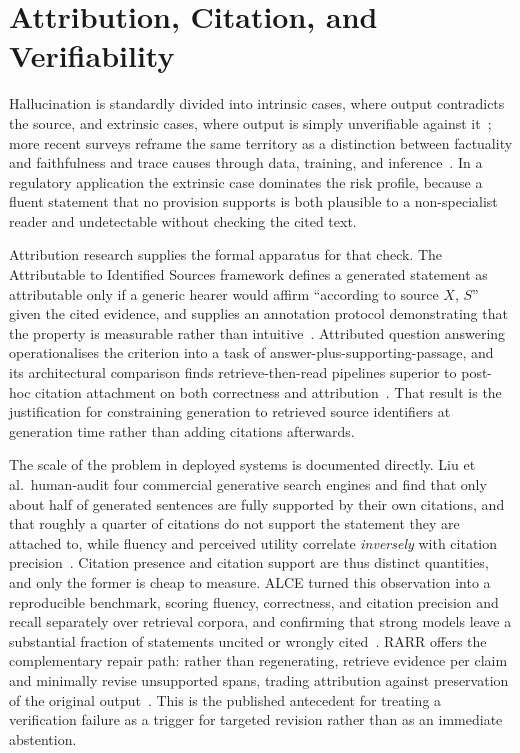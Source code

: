 \section{Attribution, Citation, and Verifiability}
\label{sec:sota-attribution}

Hallucination is standardly divided into intrinsic cases, where output contradicts the source, and extrinsic cases, where output is simply unverifiable against it~\cite{ji2023hallucination}; more recent surveys reframe the same territory as a distinction between factuality and faithfulness and trace causes through data, training, and inference~\cite{huang2025hallucination}. In a regulatory application the extrinsic case dominates the risk profile, because a fluent statement that no provision supports is both plausible to a non-specialist reader and undetectable without checking the cited text.

Attribution research supplies the formal apparatus for that check. The Attributable to Identified Sources framework defines a generated statement as attributable only if a generic hearer would affirm ``according to source $X$, $S$'' given the cited evidence, and supplies an annotation protocol demonstrating that the property is measurable rather than intuitive~\cite{rashkin2023attribution}. Attributed question answering operationalises the criterion into a task of answer-plus-supporting-passage, and its architectural comparison finds retrieve-then-read pipelines superior to post-hoc citation attachment on both correctness and attribution~\cite{bohnet2022attributed}. That result is the justification for constraining generation to retrieved source identifiers at generation time rather than adding citations afterwards.

The scale of the problem in deployed systems is documented directly. Liu et al.\ human-audit four commercial generative search engines and find that only about half of generated sentences are fully supported by their own citations, and that roughly a quarter of citations do not support the statement they are attached to, while fluency and perceived utility correlate \emph{inversely} with citation precision~\cite{liu2023verifiability}. Citation presence and citation support are thus distinct quantities, and only the former is cheap to measure. ALCE turned this observation into a reproducible benchmark, scoring fluency, correctness, and citation precision and recall separately over retrieval corpora, and confirming that strong models leave a substantial fraction of statements uncited or wrongly cited~\cite{gao2023alce}. RARR offers the complementary repair path: rather than regenerating, retrieve evidence per claim and minimally revise unsupported spans, trading attribution against preservation of the original output~\cite{gao2023rarr}. This is the published antecedent for treating a verification failure as a trigger for targeted revision rather than as an immediate abstention.

